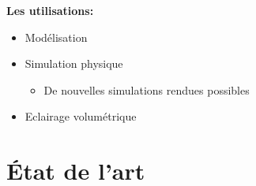 \begin{frame}[fragile=singleslide]{\insertsectionhead}
    \vspace{3cm}
    \textbf{Les utilisations:}
    \vspace{.2cm}
    \begin{itemize}
      \item Modélisation
      \vspace{.2cm}
      \item Simulation physique
        \begin{itemize}
          \vspace{.1cm}
          \item De nouvelles simulations rendues possibles
          \vspace{.05cm}
        \end{itemize}
      \item Eclairage volumétrique
    \end{itemize}

\end{frame}

\section{État de l'art}

